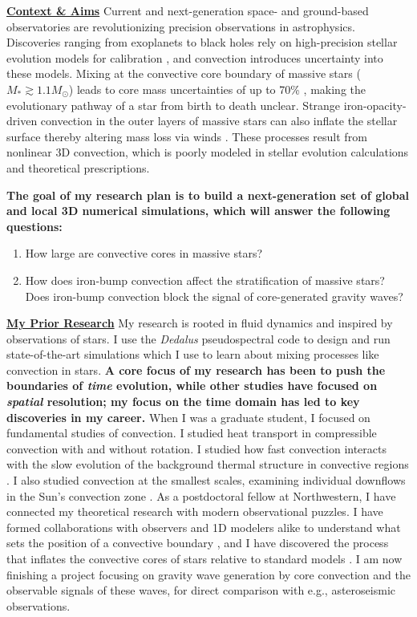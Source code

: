 \documentclass[12pt]{article}
\newcommand{\sct}[1]{\vspace{0.3cm}\hspace{-\parindent}\textbf{\underline{#1}}\hspace{0.3cm}}
\begin{document}
\thispagestyle{fancy}

\sct{Context \& Aims}
Current and next-generation space- and ground-based observatories are revolutionizing precision observations in astrophysics.
Discoveries ranging from exoplanets to black holes rely on high-precision stellar evolution models for calibration \citep{mesa6}, and convection introduces uncertainty into these models.
Mixing at the convective core boundary of massive stars ($M_* \gtrsim 1.1 M_\odot$) leads to core mass uncertainties of up to 70\% \citep{kaiser_etal_2020}, making the evolutionary pathway of a star from birth to death unclear.
Strange iron-opacity-driven convection in the outer layers of massive stars can also inflate the stellar surface thereby altering mass loss via winds \citep{kohler_etal_2015}.
These processes result from nonlinear 3D convection, which is poorly modeled in stellar evolution calculations and theoretical prescriptions.


\textbf{The goal of my research plan is to build a next-generation set of global and local 3D numerical simulations, which will answer the following questions:}\vspace{-0.2cm}
\begin{enumerate}
    \item How large are convective cores in massive stars? \vspace{-0.2cm}
    \item How does iron-bump convection affect the stratification of massive stars?
        Does iron-bump convection block the signal of core-generated gravity waves?
\end{enumerate}

\sct{My Prior Research}
My research is rooted in fluid dynamics and inspired by observations of stars.
I use the \emph{Dedalus} \citep{burns_etal_2020} pseudospectral code to design and run state-of-the-art simulations which I use to learn about mixing processes like convection in stars.
\textbf{A core focus of my research has been to push the boundaries of \emph{time} evolution, while other studies have focused on \emph{spatial} resolution; my focus on the time domain has led to key discoveries in my career.}
When I was a graduate student, I focused on fundamental studies of convection.
I studied heat transport in compressible convection with  \citep{anders_etal_2019_rot} and without \citep{anders_brown_2017} rotation.
I studied how fast convection interacts with the slow evolution of the background thermal structure in convective regions \citep{anders_etal_2018,anders_etal_2020}.
I also studied convection at the smallest scales, examining individual downflows in the Sun's convection zone \cite{anders_etal_2019_thermals}.
As a postdoctoral fellow at Northwestern, I have connected my theoretical research with modern observational puzzles.
I have formed collaborations with observers and 1D modelers alike to understand what sets the position of a convective boundary \citep{anders_etal_2022b}, and I have discovered the process that inflates the convective cores of stars relative to standard models \citep{anders_etal_2022a}.
I am now finishing a project focusing on gravity wave generation by core convection and the observable signals of these waves, for direct comparison with e.g., asteroseismic observations.
\end{document}
